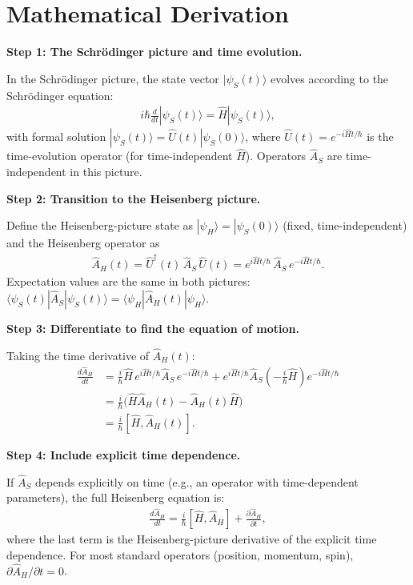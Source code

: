 \section*{Mathematical Derivation}

\textbf{Step 1: The Schr\"odinger picture and time evolution.}

In the Schr\"odinger picture, the state vector $|\psi_S(t)\rangle$ evolves according to the Schr\"odinger equation:
\begin{align}
i\hbar\frac{d}{dt}|\psi_S(t)\rangle = \hat{H}|\psi_S(t)\rangle,
\end{align}
with formal solution $|\psi_S(t)\rangle = \hat{U}(t)|\psi_S(0)\rangle$, where $\hat{U}(t) = e^{-i\hat{H}t/\hbar}$ is the time-evolution operator (for time-independent $\hat{H}$). Operators $\hat{A}_S$ are time-independent in this picture.

\textbf{Step 2: Transition to the Heisenberg picture.}

Define the Heisenberg-picture state as $|\psi_H\rangle = |\psi_S(0)\rangle$ (fixed, time-independent) and the Heisenberg operator as
\begin{align}
\hat{A}_H(t) = \hat{U}^\dagger(t)\,\hat{A}_S\,\hat{U}(t) = e^{i\hat{H}t/\hbar}\,\hat{A}_S\,e^{-i\hat{H}t/\hbar}.
\end{align}
Expectation values are the same in both pictures: $\langle\psi_S(t)|\hat{A}_S|\psi_S(t)\rangle = \langle\psi_H|\hat{A}_H(t)|\psi_H\rangle$.

\textbf{Step 3: Differentiate to find the equation of motion.}

Taking the time derivative of $\hat{A}_H(t)$:
\begin{align}
\frac{d\hat{A}_H}{dt} &= \frac{i}{\hbar}\hat{H}\,e^{i\hat{H}t/\hbar}\hat{A}_S\,e^{-i\hat{H}t/\hbar} + e^{i\hat{H}t/\hbar}\hat{A}_S\left(-\frac{i}{\hbar}\hat{H}\right)e^{-i\hat{H}t/\hbar} \\
&= \frac{i}{\hbar}\bigl(\hat{H}\hat{A}_H(t) - \hat{A}_H(t)\hat{H}\bigr) \\
&= \frac{i}{\hbar}[\hat{H}, \hat{A}_H(t)].
\end{align}

\textbf{Step 4: Include explicit time dependence.}

If $\hat{A}_S$ depends explicitly on time (e.g., an operator with time-dependent parameters), the full Heisenberg equation is:
\begin{align}
\boxed{\frac{d\hat{A}_H}{dt} = \frac{i}{\hbar}[\hat{H}, \hat{A}_H] + \frac{\partial\hat{A}_H}{\partial t},}
\end{align}
where the last term is the Heisenberg-picture derivative of the explicit time dependence. For most standard operators (position, momentum, spin), $\partial\hat{A}_H/\partial t = 0$.

